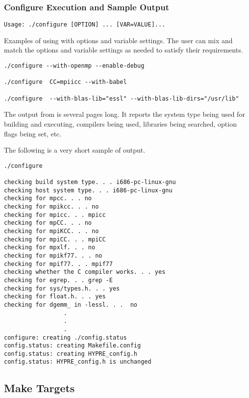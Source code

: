 \subsubsection{Configure Execution and Sample Output}
\label{Configure Execution and Sample Output}

\begin{verbatim}
Usage: ./configure [OPTION] ... [VAR=VALUE]...
\end{verbatim}

Examples of using  with options and variable settings.  The user can mix 
and match the options and variable settings as needed to satisfy their requirements.
\begin{verbatim}
./configure --with-openmp --enable-debug

./configure  CC=mpiicc --with-babel

./configure  --with-blas-lib="essl" --with-blas-lib-dirs="/usr/lib"
\end{verbatim}


The output from  is several pages long.  It reports the system type 
being used for building and executing, compilers being used, libraries being searched,
option flags being set, etc.  

The following is a very short sample of  output.
\begin{verbatim}
./configure

checking build system type. . . i686-pc-linux-gnu
checking host system type. . . i686-pc-linux-gnu
checking for mpcc. . . no
checking for mpikcc. . . no
checking for mpicc. . . mpicc
checking for mpCC. . . no
checking for mpiKCC. . . no
checking for mpiCC. . . mpiCC
checking for mpxlf. . . no
checking for mpikf77. . . no
checking for mpif77. . . mpif77
checking whether the C compiler works. . . yes
checking for egrep. . . grep -E
checking for sys/types.h. . . yes
checking for float.h. . . yes
checking for dgemm_ in -lessl. . .  no
                 .
                 .
                 .
configure: creating ./config.status
config.status: creating Makefile.config
config.status: creating HYPRE_config.h
config.status: HYPRE_config.h is unchanged

\end{verbatim}


\subsection{Make Targets}
\label{Make Targets}

